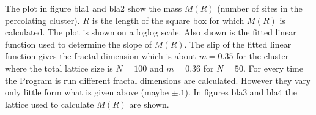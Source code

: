 The plot in figure bla1 and bla2 show the mass $M(R)$ (number of sites in the percolating cluster). $R$ is the length of the square box for which $M(R)$ is calculated. The plot is shown on a loglog scale. Also shown is the fitted linear function used to determine the slope of $M(R)$. The slip of the fitted linear function gives the fractal dimension which is about $m=0.35$ for the cluster where the total lattice size is $N=100$ and $m=0.36$ for $N=50$.
For every time the Program is run different fractal dimensions are calculated. However they vary only little form what is given above (maybe $\pm .1$).
In figures bla3 and bla4 the lattice used to calculate $M(R)$ are shown. 
